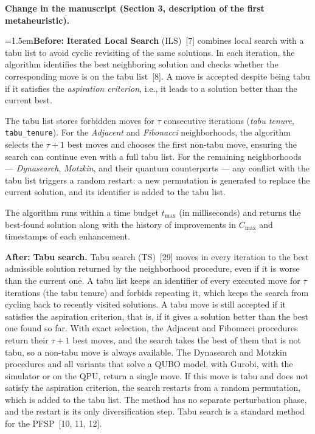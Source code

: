\documentclass[12pt]{article}
\newcommand{\change}[3]{\par\smallskip\noindent\textbf{Change in the manuscript (#1).}\par
  {\leftskip=1.5em\noindent\textbf{Before:} #2\par\noindent\textbf{After:} #3\par}}
\begin{document}
\change{Section 3, description of the first metaheuristic}{\textbf{Iterated Local Search} (ILS)~[7] combines local search with a tabu list to avoid cyclic revisiting of the same solutions. In each iteration, the algorithm identifies the best neighboring solution and checks whether the corresponding move is on the tabu list~[8]. A move is accepted despite being tabu if it satisfies the \emph{aspiration criterion}, i.e., it leads to a solution better than the current best.

The tabu list stores forbidden moves for $\tau$ consecutive iterations (\emph{tabu tenure}, \texttt{tabu\_tenure}). For the \emph{Adjacent} and \emph{Fibonacci} neighborhoods, the algorithm selects the $\tau + 1$ best moves and chooses the first non-tabu move, ensuring the search can continue even with a full tabu list. For the remaining neighborhoods — \emph{Dynasearch}, \emph{Motzkin}, and their quantum counterparts — any conflict with the tabu list triggers a random restart: a new permutation is generated to replace the current solution, and its identifier is added to the tabu list.

The algorithm runs within a time budget $t_{\max}$ (in milliseconds) and returns the best-found solution along with the history of improvements in $C_{\max}$ and timestamps of each enhancement.}{\textbf{Tabu search.} Tabu search (TS)~[29] moves in every iteration to the best admissible solution returned by the neighborhood procedure, even if it is worse than the current one. A tabu list keeps an identifier of every executed move for $\tau$ iterations (the tabu tenure) and forbids repeating it, which keeps the search from cycling back to recently visited solutions. A tabu move is still accepted if it satisfies the aspiration criterion, that is, if it gives a solution better than the best one found so far. With exact selection, the Adjacent and Fibonacci procedures return their $\tau+1$ best moves, and the search takes the best of them that is not tabu, so a non-tabu move is always available. The Dynasearch and Motzkin procedures and all variants that solve a QUBO model, with Gurobi, with the simulator or on the QPU, return a single move. If this move is tabu and does not satisfy the aspiration criterion, the search restarts from a random permutation, which is added to the tabu list. The method has no separate perturbation phase, and the restart is its only diversification step. Tabu search is a standard method for the PFSP~[10, 11, 12].}
\end{document}
